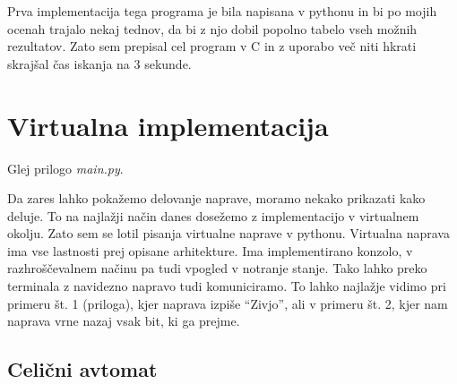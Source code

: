 \documentclass[12pt]{article}
\begin{document}
Prva implementacija tega programa je bila napisana v pythonu in bi po mojih ocenah trajalo nekaj tednov, da bi z njo dobil popolno tabelo vseh možnih rezultatov.
Zato sem prepisal cel program v C in z uporabo več niti hkrati skrajšal čas iskanja na 3 sekunde.

\section{Virtualna implementacija}
Glej prilogo \textit{main.py}.

Da zares lahko pokažemo delovanje naprave, moramo nekako prikazati kako deluje.
To na najlažji način danes dosežemo z implementacijo v virtualnem okolju.
Zato sem se lotil pisanja virtualne naprave v pythonu.
Virtualna naprava ima vse lastnosti prej opisane arhitekture.
Ima implementirano konzolo, v razhroščevalnem načinu pa tudi vpogled v notranje stanje.
Tako lahko preko terminala z navidezno napravo tudi komuniciramo.
To lahko najlažje vidimo pri primeru št. 1 (priloga), kjer naprava izpiše ``Zivjo'', ali v primeru št. 2, kjer nam naprava vrne nazaj vsak bit, ki ga prejme.

\subsection{Celični avtomat}
\end{document}
